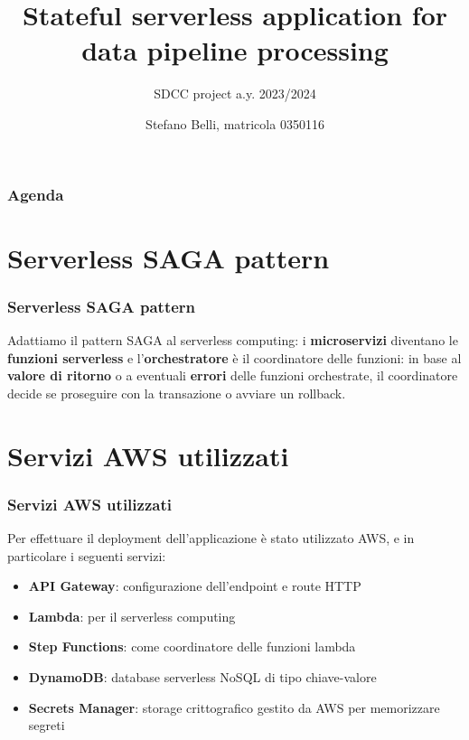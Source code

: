 \documentclass{beamer}
\title[Serverless data pipeline]{Stateful serverless application for data pipeline processing}
\subtitle{SDCC project a.y. 2023/2024}
\author[Stefano Belli, 0350116]{Stefano Belli, matricola 0350116}
\institute[uniroma2]{Università degli Studi di Roma "Tor Vergata"}
\date{}
\begin{document}
\begin{frame}
    \titlepage
\end{frame}

\begin{frame}
    \frametitle{Agenda}
    \tableofcontents
\end{frame}

\section{Serverless SAGA pattern}
\begin{frame}
    \frametitle{Serverless SAGA pattern}

    Adattiamo il pattern SAGA al serverless computing\footnotemark: i \textbf{microservizi} diventano le \textbf{funzioni 
    serverless} e l'\textbf{orchestratore} è il coordinatore delle funzioni: in base al \textbf{valore di ritorno} 
    o a eventuali \textbf{errori} delle funzioni orchestrate, il coordinatore decide se proseguire con la 
    transazione o avviare un rollback.

\end{frame}

\section{Servizi AWS utilizzati}
\begin{frame}
    \frametitle{Servizi AWS utilizzati}

    Per effettuare il deployment dell'applicazione è stato utilizzato AWS, e in particolare i seguenti servizi:

    \begin{itemize}
        \item \textbf{API Gateway}: configurazione dell'endpoint e route HTTP
        \item \textbf{Lambda}: per il serverless computing
        \item \textbf{Step Functions}: come coordinatore delle funzioni lambda
        \item \textbf{DynamoDB}: database serverless NoSQL di tipo chiave-valore
        \item \textbf{Secrets Manager}: storage crittografico gestito da AWS per memorizzare segreti
    \end{itemize}

\end{frame}
\end{document}

